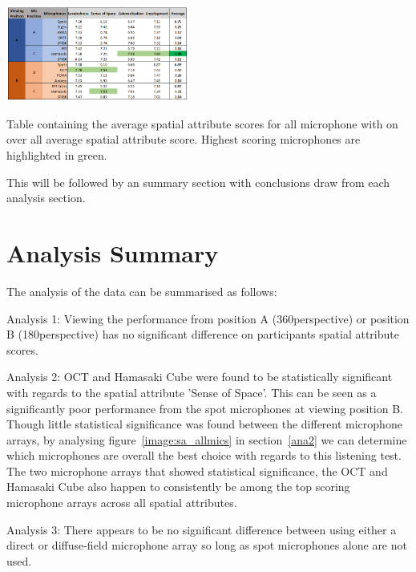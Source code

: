 	\begin{table}
	\begin{center}
		\includegraphics[width=0.45\textwidth]{images/graphs/results_sum_graph_V3.PNG}
		\caption{Table containing the average spatial attribute scores for all microphone with on over all average spatial attribute score. Highest scoring microphones are highlighted in green.}
		\label{image:results_sum} 
	\end{center}
	\end{table}	

	This will be followed by an summary section with conclusions draw from each analysis section.

	
	
	
	
	
	

	\section{Analysis Summary}

		The analysis of the data can be summarised as follows:

		Analysis 1: Viewing the performance from position A (360\textdegree perspective) or position B (180\textdegree perspective) has no significant difference on participants spatial attribute scores.

		Analysis 2: OCT and Hamasaki Cube were found to be statistically significant with regards to the spatial attribute 'Sense of Space'. This can be seen as a significantly poor performance from the spot microphones at viewing position B. Though little statistical significance was found between the different microphone arrays, by analysing figure~\ref{image:sa_allmics} in section~\ref{ana2} we can determine which microphones are overall the best choice with regards to this listening test. The two microphone arrays that showed statistical significance, the OCT and Hamasaki Cube also happen to consistently be among the top scoring microphone arrays across all spatial attributes.

		Analysis 3: There appears to be no significant difference between using either a direct or diffuse-field microphone array so long as spot microphones alone are not used.

